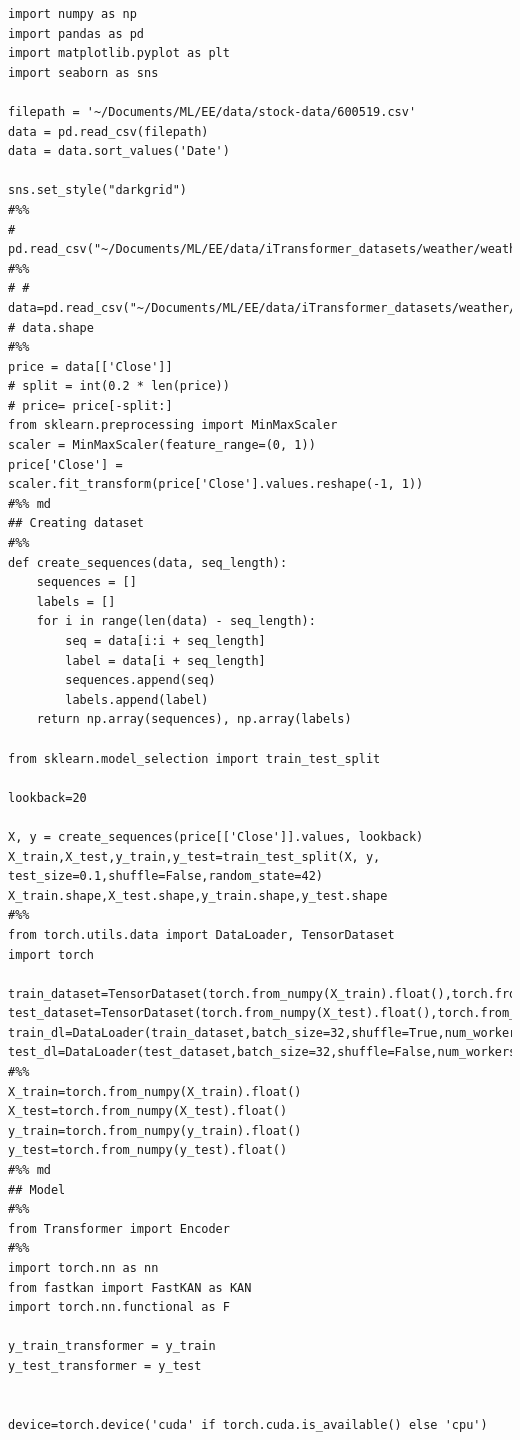 \documentclass[stu,12pt,floatsintext]{apa7}
\begin{document}
\begin{verbatim}
import numpy as np
import pandas as pd
import matplotlib.pyplot as plt
import seaborn as sns

filepath = '~/Documents/ML/EE/data/stock-data/600519.csv'
data = pd.read_csv(filepath)
data = data.sort_values('Date')

sns.set_style("darkgrid")
#%%
# pd.read_csv("~/Documents/ML/EE/data/iTransformer_datasets/weather/weather.csv").shape
#%%
# # data=pd.read_csv("~/Documents/ML/EE/data/iTransformer_datasets/weather/weather.csv")
# data.shape
#%%
price = data[['Close']]
# split = int(0.2 * len(price))
# price= price[-split:]
from sklearn.preprocessing import MinMaxScaler
scaler = MinMaxScaler(feature_range=(0, 1))
price['Close'] = scaler.fit_transform(price['Close'].values.reshape(-1, 1))
#%% md
## Creating dataset
#%%
def create_sequences(data, seq_length):
    sequences = []
    labels = []
    for i in range(len(data) - seq_length):
        seq = data[i:i + seq_length]
        label = data[i + seq_length]
        sequences.append(seq)
        labels.append(label)
    return np.array(sequences), np.array(labels)

from sklearn.model_selection import train_test_split

lookback=20

X, y = create_sequences(price[['Close']].values, lookback)
X_train,X_test,y_train,y_test=train_test_split(X, y, test_size=0.1,shuffle=False,random_state=42)
X_train.shape,X_test.shape,y_train.shape,y_test.shape
#%%
from torch.utils.data import DataLoader, TensorDataset
import torch

train_dataset=TensorDataset(torch.from_numpy(X_train).float(),torch.from_numpy(y_train).float())
test_dataset=TensorDataset(torch.from_numpy(X_test).float(),torch.from_numpy(y_test).float())
train_dl=DataLoader(train_dataset,batch_size=32,shuffle=True,num_workers=16,pin_memory=True)
test_dl=DataLoader(test_dataset,batch_size=32,shuffle=False,num_workers=16,pin_memory=True)
#%%
X_train=torch.from_numpy(X_train).float()
X_test=torch.from_numpy(X_test).float()
y_train=torch.from_numpy(y_train).float()
y_test=torch.from_numpy(y_test).float()
#%% md
## Model
#%%
from Transformer import Encoder
#%%
import torch.nn as nn
from fastkan import FastKAN as KAN
import torch.nn.functional as F

y_train_transformer = y_train
y_test_transformer = y_test


device=torch.device('cuda' if torch.cuda.is_available() else 'cpu')


\end{verbatim}
\end{document}
